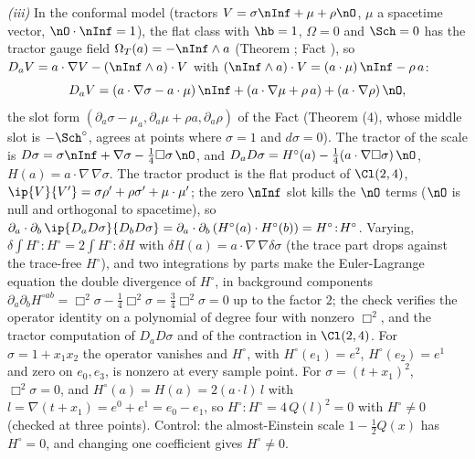 \emph{(iii)} In the conformal model (tractors $V = \sigma\nInf + \mu + \rho\nO$, $\mu$ a spacetime vector, $\nO\cdot\nInf = 1$), the flat class with $\hb = 1$, $\Omega = 0$ and $\Sch = 0$ has the tractor gauge field $\Omega_{T}(a) = -\nInf \wedge a$ (Theorem ; Fact ), so $D_{a}V = a\cdot\nabla V - (\nInf\wedge a)\cdot V$ with $(\nInf\wedge a)\cdot V = (a\cdot\mu)\,\nInf - \rho\,a$:
\[
D_{a}V = (a\cdot\nabla\sigma - a\cdot\mu)\,\nInf + (a\cdot\nabla\mu + \rho\,a) + (a\cdot\nabla\rho)\,\nO ,
\]
the slot form $(\partial_{a}\sigma - \mu_{a}, \partial_{a}\mu + \rho a, \partial_{a}\rho)$ of the Fact (Theorem (4), whose middle slot is $-\Sch^{\circ}$, agrees at points where $\sigma = 1$ and $d\sigma = 0$). The tractor of the scale is $D\sigma = \sigma\nInf + \nabla\sigma - \tfrac14\Box\sigma\,\nO$, and $D_{a}D\sigma = H^{\circ}(a) - \tfrac14(a\cdot\nabla\Box\sigma)\,\nO$, $H(a) = a\cdot\nabla\,\nabla\sigma$. The tractor product is the flat product of $\Cl(2,4)$, $\ip{V}{V'} = \sigma\rho' + \rho\sigma' + \mu\cdot\mu'$; the zero $\nInf$ slot kills the $\nO$ terms ($\nO$ is null and orthogonal to spacetime), so $\partial_{a}\cdot\partial_{b}\,\ip{D_{a}D\sigma}{D_{b}D\sigma} = \partial_{a}\cdot\partial_{b}\,(H^{\circ}(a)\cdot H^{\circ}(b)) = H^{\circ}\!:\!H^{\circ}$. Varying, $\delta\int H^{\circ}\!:\!H^{\circ} = 2\int H^{\circ}\!:\!\delta H$ with $\delta H(a) = a\cdot\nabla\,\nabla\delta\sigma$ (the trace part drops against the trace-free $H^{\circ}$), and two integrations by parts make the Euler-Lagrange equation the double divergence of $H^{\circ}$, in background components $\partial_{a}\partial_{b}H^{\circ ab} = \Box^{2}\sigma - \tfrac14\Box^{2}\sigma = \tfrac34\Box^{2}\sigma = 0$ up to the factor $2$; the check verifies the operator identity on a polynomial of degree four with nonzero $\Box^{2}$, and the tractor computation of $D_{a}D\sigma$ and of the contraction in $\Cl(2,4)$. For $\sigma = 1 + x_{1}x_{2}$ the operator vanishes and $H^{\circ}$, with $H^{\circ}(e_{1}) = e^{2}$, $H^{\circ}(e_{2}) = e^{1}$ and zero on $e_{0}, e_{3}$, is nonzero at every sample point. For $\sigma = (t + x_{1})^{2}$, $\Box^{2}\sigma = 0$, and $H^{\circ}(a) = H(a) = 2(a\cdot l)\,l$ with $l = \nabla(t + x_{1}) = e^{0} + e^{1} = e_{0} - e_{1}$, so $H^{\circ}\!:\!H^{\circ} = 4\,Q(l)^{2} = 0$ with $H^{\circ} \ne 0$ (checked at three points). Control: the almost-Einstein scale $1 - \tfrac12 Q(x)$ has $H^{\circ} = 0$, and changing one coefficient gives $H^{\circ} \ne 0$.

